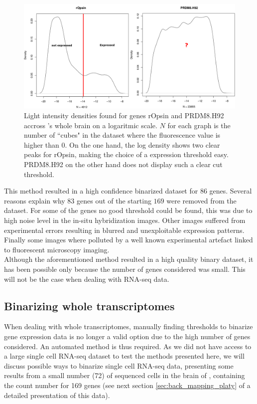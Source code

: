 	\begin{figure}[bth]
\centerline{\includegraphics[width=\linewidth]{gfx/chapter2/densities_bina.png}}
\caption{Light intensity densities found for genes rOpsin and PRDM8.H92 accross \platy{}'s whole brain on a logaritmic scale. $N$ for each graph is the number of ``cubes" in the dataset where the fluorescence value is higher than $0$. On the one hand, the log density shows two clear peaks for rOpsin, making the choice of a expression threshold easy. PRDM8.H92 on the other hand does not display such a clear cut threshold.}\label{fig:densities_bina}
	\end{figure}
	
	This method resulted in a high confidence binarized dataset for $86$ genes. Several reasons explain why $83$ genes out of the starting $169$ were removed from the dataset. For some of the genes no good threshold could be found, this was due to high noise level in the in-situ hybridization images. Other images suffered from experimental errors resulting in blurred and unexploitable expression patterns. Finally some images where polluted by a well known experimental artefact linked to fluorescent microscopy imaging.\\
	
	Although the aforementioned method resulted in a high quality binary dataset, it has been possible only because the number of genes considered was small. This will not be the case when dealing with RNA-seq data.

  \subsection{Binarizing whole transcriptomes}
  
  When dealing with whole transcriptomes, manually finding thresholds to binarize gene expression data is no longer a valid option due to the high number of genes considered. An automated method is thus required. As we did not have access to a large single cell RNA-seq dataset to test the methods presented here, we will discuss possible ways to binarize single cell RNA-seq data, presenting some results from a small number (72) of sequenced cells in the brain of \platy{}, containing the count number for 169 genes (see next section \ref{sec:back_mapping_platy} of a detailed presentation of this data).\\
  
